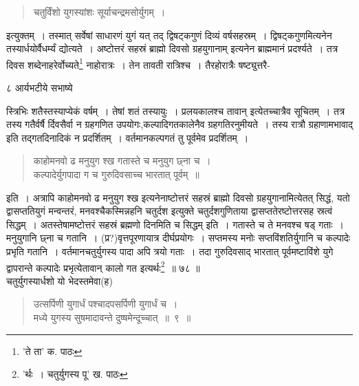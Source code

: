\documentclass[11pt, openany]{book}
\begin{document}
\begin{quote} 
{\qt चतुर्विंशो युगस्यांशः सूर्याचन्द्रमसोर्युगम्~।}
\end{quote} 

इत्युक्तम्~। तस्मात् सर्वेषां साधारणं युगं यत् तद् द्विषट्कगुणं दिव्यं वर्षसहस्रम्~। द्विषट्कगुणमित्यनेन तस्यार्धयोर्वैधर्म्यं द्योत्यते~।
{\qt अष्टोत्तरं सहस्रं ब्राह्मो दिवसो ग्रहयुगानाम्} इत्यनेन ब्राह्ममानं प्रदर्श्यते~। तत्र दिवस शब्देनाहरेर्वोच्यते\renewcommand{\thefootnote}{६}\footnote{'ते ता' क. पाठः} नाहोरात्रः~। तेन तावती रात्रिश्च~। तैरहोरात्रैः षष्ट्युत्तरै-

\newpage


\vspace{3cm} ८ \hspace{4cm}आर्यभटीये सभाष्ये

\vspace{0.3cm}
\begin{sloppypar} 
\noindent स्त्रिभिः शतैस्तस्याप्येकं वर्षम्~। तेषां शतं तस्यायुः~। प्रलयकालश्च तावान् इत्येतच्चात्रैव सूचितम्~। तत्र तस्य गतैर्वर्षै र्दिवसैर्वा न ग्रहगणित उपयोगः,कल्पादिगतकालेनैव ग्रहगतिरनुमीयते~। तस्य रात्रौ ग्रहाणामभावाद् इति तद्गतदिनादिकं न प्रदर्शितम्~। वर्तमानकल्पगतं तु पूर्वमेव प्रदर्शितम्~।
\end{sloppypar}

\begin{quote}   
{\qt काहोमनवो ढ मनुयुग श्ख गतास्ते च मनुयुग छ्ना च~।\\
कल्पादेर्युगपादा ग च गुरुदिवसाच्च भारतात् पूर्वम्~॥}
\end{quote}

\noindent इति~। अत्रापि {\qt काहोमनवो ढ मनुयुग श्ख} इत्यनेनाष्टोत्तरं सहस्रं ब्राह्मो दिवसो ग्रहयुगानामित्येतत् सिद्धं, यतो द्वासप्ततियुगं मन्वन्तरं, मनवश्चैकस्मिन्नहनि चतुर्दश इत्युक्ते चतुर्दशगुणिताया द्वासप्ततेरष्टोत्तरसह स्रत्वं सिद्धम्~। अतस्तेषामष्टोत्तरं सहस्रं ब्रह्मणो दिनमिति च सिद्धम् इति~। गतास्ते च ते मनवश्च षड् गताः~। मनुयुगानि छ्ना च गतानि~। (प्र?)वृत्तपूरणायात्र दीर्घप्रयोगः~। सप्तमस्य मनोः सप्तविंशतिर्युगानि च कल्पादेः प्रभृति गतानि~। वर्तमानचतुर्युगस्य पादा अपि त्रयो गताः~। तदा गुरुदिवसाद् भारतात् पूर्वमष्टाविंशे युगे द्वापरान्ते कल्पादेः प्रभृत्येतावान् कालो गत इत्यर्थः\renewcommand{\thefootnote}{१}\footnote{'र्थः~। चतुर्युगस्य पू' ख. पाठः}~॥ ७\textendash ८ ॥ \\

चतुर्युगस्यार्धशो यो भेदस्तमेवा(ह)\textendash

\begin{quote} 
{\ab उत्सर्पिणी युगार्धं पश्चादपसर्पिणी युगार्धं च~।\\
मध्ये युगस्य सुषमादावन्ते दुष्षमेन्दूच्चात्~॥~९~॥}
\end{quote}
\end{document}
